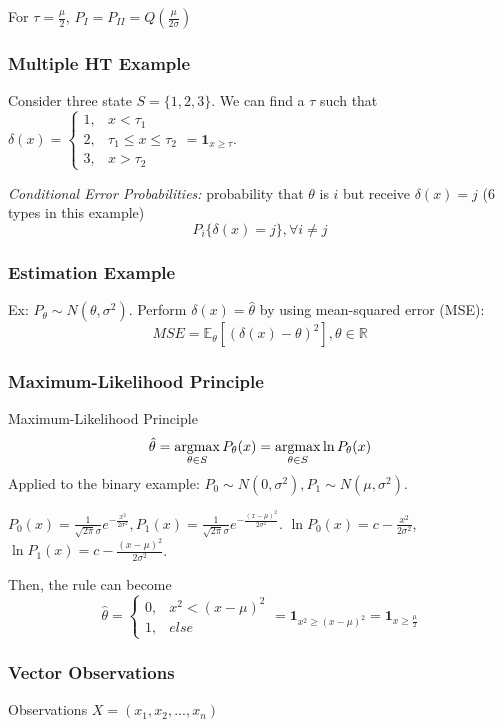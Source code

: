 \documentclass[11pt,a4paper]{article}
\newcommand{\argmax}{\operatornamewithlimits{argmax}}
\begin{document}
For $\tau=\frac{\mu}{2}$, $P_I=P_{II}=Q\left(\frac{\mu}{2\sigma}\right)$

\subsubsection*{Multiple HT Example}
Consider three state $S=\{1,2,3\}$.
We can find a $\tau$ such that $\delta(x)=\left\{\begin{matrix}
    1,&x< \tau_1\\
    2,& \tau_1\leq x\leq \tau_2\\
    3,& x>\tau_2
\end{matrix}\right.=\mathbf{1}_{x\geq \tau}$.

\textit{Conditional Error Probabilities:} probability that $\theta$ is $i$ but receive $\delta(x)=j$ (6 types in this example) $$P_i\{\delta(x)=j\}, \forall i\neq j$$

\subsubsection*{Estimation Example}
Ex: $P_\theta\sim N(\theta,\sigma^2)$. Perform $\delta(x)=\hat{\theta}$ by using mean-squared error (MSE):
$$MSE= \mathbb{E}_\theta \left[(\delta(x)-\theta)^2\right],\theta\in \mathbb{R}$$

\subsubsection{Maximum-Likelihood Principle}
Maximum-Likelihood Principle $$\hat{\theta}=\argmax_{\theta\in S}P_{\theta}(x)=\argmax_{\theta\in S}\ln P_{\theta}(x)$$
Applied to the binary example: $P_0\sim N(0,\sigma^2), P_1\sim N(\mu,\sigma^2)$.

$P_0(x)=\frac{1}{\sqrt{2\pi}\sigma}e^{-\frac{x^2}{2\sigma^2}}, P_1(x)=\frac{1}{\sqrt{2\pi}\sigma}e^{-\frac{(x-\mu)^2}{2\sigma^2}}$. $\ln P_0(x)=c-\frac{x^2}{2\sigma^2}$, $\ln P_1(x)=c-\frac{(x-\mu)^2}{2\sigma^2}$.

Then, the rule can become $$\hat{\theta}=\left\{\begin{matrix}
    0,&x^2<(x-\mu)^2\\
    1,&else
\end{matrix}\right.=\mathbf{1}_{x^2\geq (x-\mu)^2}=\mathbf{1}_{x\geq \frac{\mu}{2}}$$

\subsubsection*{Vector Observations}
Observations $X=\left(x_1,x_2,...,x_n\right)$
\end{document}
